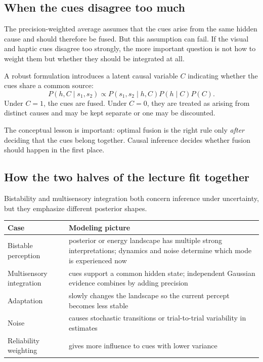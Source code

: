 \subsection{When the cues disagree too much}

The precision-weighted average assumes that the cues arise from the same hidden cause and should therefore be fused. But this assumption can fail. If the visual and haptic cues disagree too strongly, the more important question is not how to weight them but whether they should be integrated at all.

A robust formulation introduces a latent causal variable \(C\) indicating whether the cues share a common source:
\[
P(h,C\mid s_1,s_2) \propto P(s_1,s_2\mid h,C)P(h\mid C)P(C).
\]
Under \(C=1\), the cues are fused. Under \(C=0\), they are treated as arising from distinct causes and may be kept separate or one may be discounted.

The conceptual lesson is important: optimal fusion is the right rule only \emph{after} deciding that the cues belong together. Causal inference decides whether fusion should happen in the first place.

\subsection{How the two halves of the lecture fit together}

Bistability and multisensory integration both concern inference under uncertainty, but they emphasize different posterior shapes.

\begin{center}
\begin{tabular}{lp{}}
\hline
Case & Modeling picture \\
\hline
Bistable perception & posterior or energy landscape has multiple strong interpretations; dynamics and noise determine which mode is experienced now \\
Multisensory integration & cues support a common hidden state; independent Gaussian evidence combines by adding precision \\
Adaptation & slowly changes the landscape so the current percept becomes less stable \\
Noise & causes stochastic transitions or trial-to-trial variability in estimates \\
Reliability weighting & gives more influence to cues with lower variance \\
\hline
\end{tabular}
\end{center}

